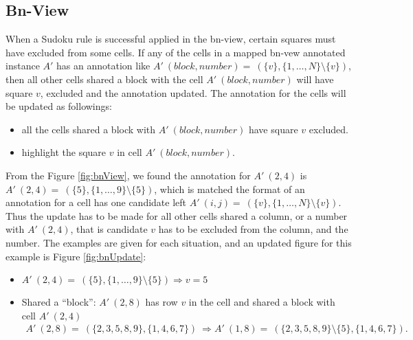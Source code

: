 \documentclass[11pt]{report}
\newcommand{\set}[1]{\{ #1 \}}
\begin{document}
\subsection{Bn-View}
\label{sec:basicruleBn}

When a Sudoku rule is successful applied in the bn-view, certain squares must have excluded from some cells. If any of the cells in a mapped bn-vew annotated instance $A'$ has an annotation like $A'\ (block, number) =\ (\set{v}, \set{1,\dots,N} \setminus \set{v})$, then all other cells shared a block with the cell $A'\ (block, number)$ will have square $v$, excluded and the annotation updated. The annotation for the cells will be updated as followings:
\begin{itemize}
\item all the cells shared a block with $A'\ (block, number)$ have square $v$ excluded.
\item highlight the square $v$ in cell $A'\ (block, number)$.
\end{itemize} 

From the Figure \ref{fig:bnView}, we found the annotation for $A'\ (2,4)$ is $A'\ (2, 4) =\ (\set{5}, \set{1, \dots, 9} \setminus \set{5})$, which is matched the format of an annotation for a cell has one candidate left $A'\ (i,j) =\ (\set{v}, \set{1,\dots,N} \setminus \set{v})$. Thus the update has to be made for all other cells shared a column, or a number with $A'\ (2,4)$, that is candidate $v$ has to be excluded from the column, and the number. The examples are given for each situation, and an updated figure for this example is Figure \ref{fig:bnUpdate}:
\begin{itemize}
\item $A'\ (2,4) =\ (\set{5}, \set{1, \dots, 9} \setminus \set{5}) \Rightarrow v = 5$
\item Shared a ``block'': $A'\ (2,8)$ has row $v$ in the cell and shared a block with cell $A'\ (2,4)$
\begin{eqnarray*}
A'\ (2,8) =\ (\set{2, 3, 5, 8, 9}, \set{1, 4, 6, 7})\ \Rightarrow A'\ (1,8) =\ (\set{2, 3, 5, 8, 9}\setminus \set{5}, \set{1, 4, 6, 7}).
\end{eqnarray*}
\end{itemize}
\end{document}

